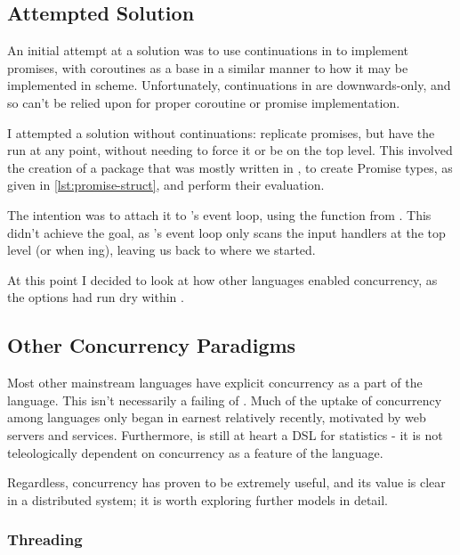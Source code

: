 \subsection{Attempted Solution}

An initial attempt at a solution was to use continuations in \R{} to implement promises, with coroutines as a base in a similar manner to how it may be implemented in scheme.
Unfortunately, continuations in \R{} are downwards-only, and so can't be relied upon for proper coroutine or promise implementation.

I attempted a solution without continuations: replicate promises, but have the  run at any point, without needing to force it or be on the top level.
This involved the creation of a package that was mostly written in , to create Promise types, as given in \cref{lst:promise-struct}, and perform their evaluation.


The intention was to attach it to \R{}'s event loop, using the  function from .
This didn't achieve the goal, as \R{}'s event loop only scans the input handlers at the top level (or when ing), leaving us back to where we started.

At this point I decided to look at how other languages enabled concurrency, as the options had run dry within \R{}.

\subsection{Other Concurrency Paradigms}

Most other mainstream languages have explicit concurrency as a part of the language.
This isn't necessarily a failing of \R{}.
Much of the uptake of concurrency among languages only began in earnest relatively recently, motivated by web servers and services.
Furthermore, \R{} is still at heart a DSL for statistics - it is not teleologically dependent on concurrency as a feature of the language.

Regardless, concurrency has proven to be extremely useful, and its value is clear in a distributed system; it is worth exploring further models in detail.

\subsubsection{Threading}

